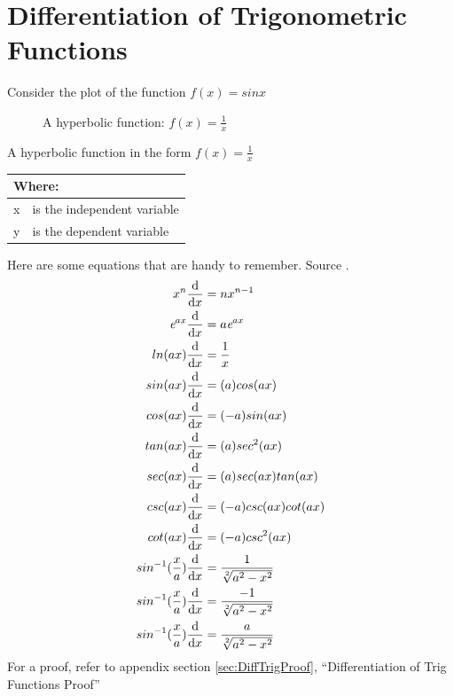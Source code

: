 \section{Differentiation of Trigonometric Functions}
\label{sec:DifferentiationOfTrigFunctions}
Consider the plot of the function $f(x) = sinx$
\begin{figure}[!htb]
\label{fig:GraphTemplate}
\caption{A hyperbolic function: $f(x) = \frac{1}{x}$}
\end{figure}
A hyperbolic function in the form $ f(x) = \frac{1}{x}$
\begin{table}[!hbt]
\label{tab:GraphTemplateParts}
\begin{tabularx}{\linewidth}{| l X |}
  \hline
  \multicolumn{2}{|l|}{Where:} \\
  \hline \hline
  x & is the independent variable\\
  y & is the dependent variable\\
\hline
\end{tabularx}
\end{table}
%
Here are some equations that are handy to remember. Source \cite{RHBDiffQuickStart}.
\begin{align}
  {x}^{n}\frac{\mathrm{d}}{\mathrm{d}x} & = n{x}^{n-1} \\
  {\emph{e}}^{ax}\frac{\mathrm{d}}{\mathrm{d}x} & = a{\emph{e}}^{ax} \\
  ln(ax)\frac{\mathrm{d}}{\mathrm{d}x} & = \frac{1}{x} \\
  sin(ax)\frac{\mathrm{d}}{\mathrm{d}x} & = (a)cos(ax) \\
  cos(ax)\frac{\mathrm{d}}{\mathrm{d}x} & = (-a)sin(ax) \\
  tan(ax)\frac{\mathrm{d}}{\mathrm{d}x} & = (a){sec}^{2}(ax) \\
  sec(ax)\frac{\mathrm{d}}{\mathrm{d}x} & = (a)sec(ax)tan(ax) \\
  csc(ax)\frac{\mathrm{d}}{\mathrm{d}x} & = (-a)csc(ax)cot(ax) \\
  cot(ax)\frac{\mathrm{d}}{\mathrm{d}x} & = (-a){csc}^{2}(ax) \\
  {sin}^{-1}(\frac{x}{a})\frac{\mathrm{d}}{\mathrm{d}x} & = \frac{1}{\sqrt[2]{{a}^{2} - {x}^{2}}} \\
  {sin}^{-1}(\frac{x}{a})\frac{\mathrm{d}}{\mathrm{d}x} & = \frac{-1}{\sqrt[2]{{a}^{2} - {x}^{2}}} \\
  {sin}^{-1}(\frac{x}{a})\frac{\mathrm{d}}{\mathrm{d}x} & = \frac{a}{\sqrt[2]{{a}^{2} - {x}^{2}}}  
\end{align}
For a proof, refer to appendix section \ref{sec:DiffTrigProof},
``Differentiation of Trig Functions Proof''
